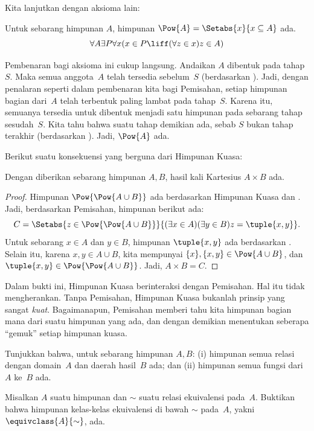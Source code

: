 \documentclass[../../../include/open-logic-section]{subfiles}
\begin{document}

Kita lanjutkan dengan aksioma lain:

\begin{axiom}
Untuk sebarang himpunan $A$, himpunan
$\Pow{A}=\Setabs{x}{x\subseteq A}$ ada.
\[
	\forall A \exists P \forall x(x \in P \liff (\forall z \in x)z \in A)
\]
\end{axiom}

Pembenaran bagi aksioma ini cukup langsung. Andaikan $A$ dibentuk pada
tahap~$S$. Maka semua anggota~$A$ telah tersedia sebelum~$S$ (berdasarkan
\stagesacc). Jadi, dengan penalaran seperti dalam pembenaran kita bagi
Pemisahan, setiap himpunan bagian dari~$A$ telah terbentuk paling lambat pada
tahap~$S$. Karena itu, semuanya tersedia untuk dibentuk menjadi satu himpunan
pada sebarang tahap sesudah~$S$. Kita tahu bahwa suatu tahap demikian ada,
sebab $S$ bukan tahap terakhir (berdasarkan \stagessucc). Jadi, $\Pow{A}$
ada.

Berikut suatu konsekuensi yang berguna dari Himpunan Kuasa:

\begin{prop}\label{thm:Products}
Dengan diberikan sebarang himpunan $A,B$, hasil kali Kartesius
$A\times B$ ada.
\end{prop}

\begin{proof}
Himpunan $\Pow{\Pow{A\cup B}}$ ada berdasarkan Himpunan Kuasa dan
. Jadi, berdasarkan Pemisahan,
himpunan berikut ada:
\[
	C = \Setabs{z \in \Pow{\Pow{A \cup B}}}{(\exists x \in A)(\exists y \in B) z = \tuple{x, y}}.
\]
Untuk sebarang $x\in A$ dan $y\in B$, himpunan $\tuple{x,y}$ ada berdasarkan
. Selain itu, karena
$x,y\in A\cup B$, kita mempunyai $\{x\},\{x,y\}\in\Pow{A\cup B}$, dan
$\tuple{x,y}\in\Pow{\Pow{A\cup B}}$. Jadi, $A\times B=C$.
\end{proof}

Dalam bukti ini, Himpunan Kuasa berinteraksi dengan Pemisahan. Hal itu tidak
mengherankan. Tanpa Pemisahan, Himpunan Kuasa bukanlah prinsip yang sangat
\emph{kuat}. Bagaimanapun, Pemisahan memberi tahu kita himpunan bagian mana
dari suatu himpunan yang ada, dan dengan demikian menentukan seberapa
``gemuk'' setiap himpunan kuasa.

\begin{prob}
Tunjukkan bahwa, untuk sebarang himpunan $A,B$: (i) himpunan semua relasi
dengan domain~$A$ dan daerah hasil~$B$ ada; dan (ii) himpunan semua fungsi
dari $A$ ke~$B$ ada.
\end{prob}

\begin{prob}
Misalkan $A$ suatu himpunan dan $\sim$ suatu relasi ekuivalensi pada~$A$.
Buktikan bahwa himpunan kelas-kelas ekuivalensi di bawah $\sim$ pada~$A$,
yakni $\equivclass{A}{\sim}$, ada.
\end{prob}
\end{document}
